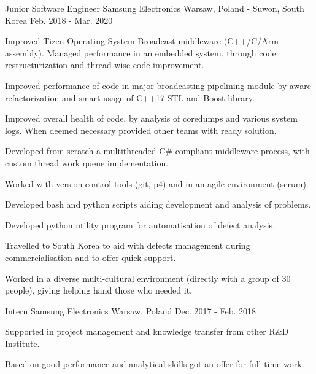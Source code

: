 

\begin{cventries}

  \cventry
    {Junior Software Engineer} %
    {Samsung Electronics} %
    {Warsaw, Poland - Suwon, South Korea} %
    {Feb. 2018 - Mar. 2020} %
    {
      \begin{cvitems} %
        \item {Improved Tizen Operating System Broadcast middleware (C++/C/Arm assembly). Managed performance in an embedded system, through code restructurization and thread-wise code improvement.}
        \item {Improved performance of code in major broadcasting pipelining module by aware refactorization and smart usage of C++17 STL and Boost library.}
        \item {Improved overall health of code, by analysis of coredumps and various system logs. When deemed necessary provided other teams with ready solution.}
        \item {Developed from scratch a multithreaded C# compliant middleware process, with custom thread work queue implementation.}
        \item {Worked with version control tools (git, p4) and in an agile environment (scrum).}
        \item {Developed bash and python scripts aiding development and analysis of problems.}
        \item {Developed python utility program for automatisation of defect analysis.}
        \item {Travelled to South Korea to aid with defects management during commercialisation and to offer quick support.}
        \item {Worked in a diverse multi-cultural environment (directly with a group of 30 people), giving helping hand those who needed it.}
      \end{cvitems}
    }

  \cventry
    {Intern} %
    {Samsung Electronics} %
    {Warsaw, Poland} %
    {Dec. 2017 - Feb. 2018} %
    {
      \begin{cvitems} %
        \item {Supported in project management and knowledge transfer from other R\&D Institute.}
        \item {Based on good performance and analytical skills got an offer for full-time work.}
      \end{cvitems}
    }


\end{cventries}
